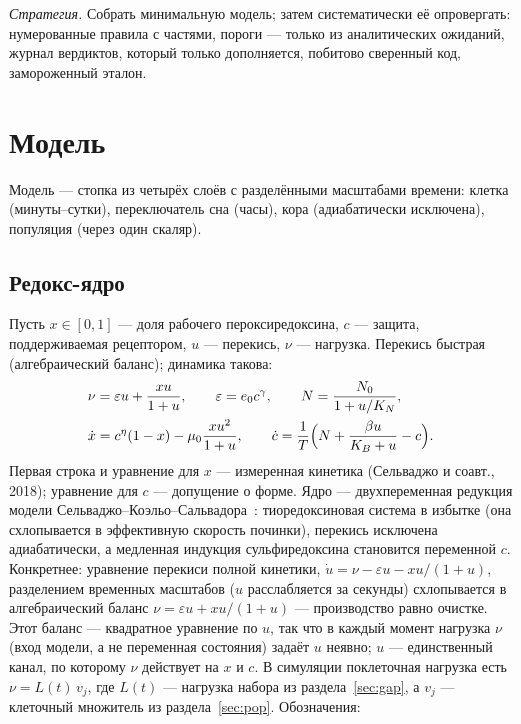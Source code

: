 \documentclass[11pt,a4paper]{article}
\theoremstyle{remark}
\begin{document}
\emph{Стратегия.} Собрать минимальную модель; затем систематически её опровергать:
нумерованные правила с частями, пороги --- только из аналитических ожиданий, журнал
вердиктов, который только дополняется, побитово сверенный код, замороженный эталон.

\section{Модель}\label{sec:model}
Модель --- стопка из четырёх слоёв с разделёнными масштабами времени: клетка
(минуты--сутки), переключатель сна (часы), кора (адиабатически исключена), популяция (через один
скаляр).

\subsection{Редокс-ядро}\label{sec:core}
Пусть $x\in[0,1]$ --- доля рабочего пероксиредоксина, $c$ --- защита, поддерживаемая
рецептором, $u$ --- перекись, $\nu$ --- нагрузка. Перекись быстрая (алгебраический
баланс); динамика такова:
\begin{equation}\label{eq:core}
\begin{aligned}
&\nu=\varepsilon u+\frac{xu}{1+u},\qquad
\varepsilon=e_0c^{\gamma},\qquad
N=\frac{N_0}{1+u/K_N},\\
&\dot x=c^{\eta}(1-x)-\mu_0\frac{xu^2}{1+u},\qquad
\dot c=\frac{1}{T}\Bigl(N+\frac{\beta u}{K_B+u}-c\Bigr).
\end{aligned}
\end{equation}
Первая строка и уравнение для $x$ --- измеренная кинетика (Сельваджо и соавт., 2018);
уравнение для $c$ --- допущение о форме. Ядро --- двухпеременная редукция модели
Сельваджо--Коэльо--Сальвадора~\cite{selvaggio}: тиоредоксиновая система в избытке (она
схлопывается в эффективную скорость починки), перекись исключена адиабатически, а
медленная индукция сульфиредоксина становится переменной $c$. Конкретнее: уравнение
перекиси полной кинетики, $\dot u=\nu-\varepsilon u-xu/(1+u)$, разделением временных
масштабов ($u$ расслабляется за секунды) схлопывается в алгебраический баланс
$\nu=\varepsilon u+xu/(1+u)$ --- производство равно очистке. Этот баланс --- квадратное
уравнение по $u$, так что в каждый момент нагрузка $\nu$ (вход модели, а не переменная
состояния) задаёт $u$ неявно; $u$ --- единственный канал, по которому $\nu$ действует на
$x$ и $c$. В симуляции поклеточная нагрузка есть $\nu=L(t)\,v_j$, где $L(t)$ ---
нагрузка набора из раздела~\ref{sec:gap}, а $v_j$ --- клеточный множитель из
раздела~\ref{sec:pop}. Обозначения:
\end{document}

